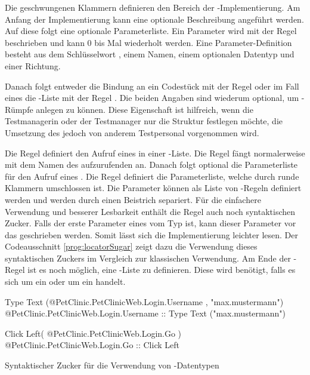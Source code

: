 \SuperPar
Die geschwungenen Klammern definieren den Bereich der -Implementierung. Am Anfang der Implementierung kann eine optionale Beschreibung angeführt werden. Auf diese folgt eine optionale Parameterliste. Ein Parameter wird mit der Regel  beschrieben und kann 0 bis  Mal wiederholt werden. Eine Parameter-Definition besteht aus dem Schlüsselwort , einem Namen, einem optionalen Datentyp und einer Richtung.

\SuperPar
Danach folgt entweder die Bindung an ein Codestück mit der Regel  oder im Fall eines  die -Liste mit der Regel . Die beiden Angaben sind wiederum optional, um -Rümpfe anlegen zu können. Diese Eigenschaft ist hilfreich, wenn die Testmanagerin oder der Testmanager nur die Struktur festlegen möchte, die Umsetzung des  jedoch von anderem Testpersonal vorgenommen wird. 

\SuperPar
Die Regel  definiert den Aufruf eines  in einer -Liste. Die Regel fängt normalerweise mit dem Namen des aufzurufenden  an. Danach folgt optional die Parameterliste für den Aufruf eines . Die Regel  definiert die Parameterliste, welche durch runde Klammern umschlossen ist. Die Parameter können als Liste von -Regeln definiert werden und werden durch einen Beistrich separiert. Für die einfachere Verwendung und besserer Lesbarkeit enthält die Regel  auch noch syntaktischen Zucker. Falls der erste Parameter eines  vom Typ  ist, kann dieser Parameter vor das  geschrieben werden. Somit lässt sich die Implementierung leichter lesen. Der Codeausschnitt \ref{prog:locatorSugar} zeigt dazu die Verwendung dieses syntaktischen Zuckers im Vergleich zur klassischen Verwendung. Am Ende der -Regel ist es noch möglich, eine -Liste zu definieren. Diese wird benötigt, falls es sich um ein  oder um ein  handelt.

\begin{program}
\begin{JavaCode}
  Type Text (@PetClinic.PetClinicWeb.Login.Username ,  "max.mustermann")
	@PetClinic.PetClinicWeb.Login.Username :: Type Text ("max.mustermann")
	
	
	Click Left( @PetClinic.PetClinicWeb.Login.Go )
  @PetClinic.PetClinicWeb.Login.Go :: Click Left
\end{JavaCode}
\caption{Syntaktischer Zucker für die Verwendung von -Datentypen}
\label{prog:locatorSugar}
\end{program}


